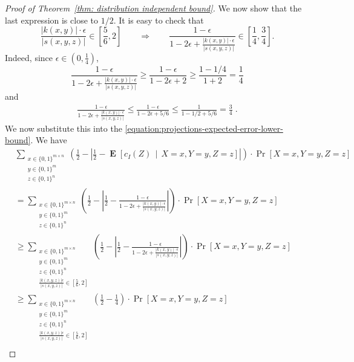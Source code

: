 \documentclass[11pt]{article}
\DeclareMathOperator{\Exp}{\mathbf{E}}
\begin{document}
\begin{proof}[Proof of Theorem~\ref{thm: distribution independent bound}]
We now show that the last expression is close to $1/2$. It is easy to check that
$$
\frac{|k(x,y)| \cdot \epsilon}{|s(x,y,z)|} \in \left[\frac{5}{6}, 2 \right] \qquad \Longrightarrow \qquad \frac{\displaystyle 1 - \epsilon}{\displaystyle 1 - 2\epsilon + \frac{|k(x,y)| \cdot \epsilon}{|s(x,y,z)|}} \in \left[ \frac{1}{4}, \frac{3}{4} \right].
$$
Indeed, since $\epsilon \in (0,\frac{1}{4})$,
$$
\frac{\displaystyle 1 - \epsilon}{\displaystyle 1 - 2\epsilon + \frac{|k(x,y)| \cdot \epsilon}{|s(x,y,z)|}} \ge
\frac{\displaystyle 1 - \epsilon}{\displaystyle 1 - 2\epsilon + 2} \ge \frac{\displaystyle 1 - 1/4}{\displaystyle 1 + 2} = \frac{1}{4}
$$
and
\begin{align*}
\frac{\displaystyle 1 - \epsilon}{\displaystyle 1 - 2\epsilon + \frac{|k(x,y)| \cdot \epsilon}{|s(x,y,z)|}}
\le \frac{\displaystyle 1 - \epsilon}{\displaystyle 1 - 2\epsilon + 5/6}
\le \frac{\displaystyle 1}{\displaystyle 1 - 1/2 + 5/6} = \frac{3}{4} \; .
\end{align*}
We now substitute this into the \eqref{equation:projections-expected-error-lower-bound}. We have
\begin{align*}
& \sum_{\substack{x \in \{0,1\}^{m \times n} \\ y \in \{0,1\}^m \\ z \in \{0,1\}^n}} \left( \frac{1}{2} - \left| \frac{1}{2} - \Exp\left[ c_I(Z) \, \middle| \, X = x, Y = y, Z = z \right] \right| \right)   \cdot \Pr \left[X = x, Y = y, Z = z \right] \\
& = \sum_{\substack{x \in \{0,1\}^{m \times n} \\ y \in \{0,1\}^m \\ z \in \{0,1\}^n}} \left( \frac{1}{2} - \left| \frac{1}{2} - \frac{\displaystyle 1 - \epsilon}{\displaystyle 1 - 2\epsilon + \frac{|k(x,y)| \cdot \epsilon}{|s(x,y,z)|}} \right| \right)  \cdot \Pr \left[X = x, Y = y, Z = z \right] \\
& \ge
\sum_{\substack{x \in \{0,1\}^{m \times n} \\ y \in \{0,1\}^m \\ z \in \{0,1\}^n \\ \frac{|k(x,y,z)| \epsilon}{|s(x,y,z)|} \in [\frac{5}{6},2]}} \left( \frac{1}{2} - \left| \frac{1}{2} - \frac{\displaystyle 1 - \epsilon}{\displaystyle 1 - 2\epsilon + \frac{|k(x,y)| \cdot \epsilon}{|s(x,y,z)|}} \right|  \right)   \cdot \Pr \left[X = x, Y = y, Z = z \right] \\
& \ge
\sum_{\substack{x \in \{0,1\}^{m \times n} \\ y \in \{0,1\}^m \\ z \in \{0,1\}^n \\ \frac{|k(x,y,z)| \epsilon}{|s(x,y,z)|} \in [\frac{5}{6},2]}} \left( \frac{1}{2} - \frac{1}{4} \right) \cdot \Pr \left[X = x, Y = y, Z = z \right] \\

\end{align*}
\end{proof}
\end{document}
